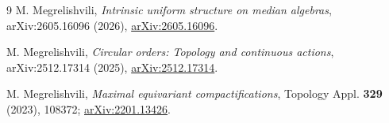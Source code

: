 \documentclass[11pt]{article}
\begin{document}
\begin{thebibliography}{9}
M. Megrelishvili,
\emph{Intrinsic uniform structure on median algebras},
arXiv:2605.16096 (2026),
\href{https://arxiv.org/abs/2605.16096}{arXiv:2605.16096}.

M. Megrelishvili,
\emph{Circular orders: Topology and continuous actions},
arXiv:2512.17314 (2025),
\href{https://arxiv.org/abs/2512.17314}{arXiv:2512.17314}.

M. Megrelishvili,
\emph{Maximal equivariant compactifications},
Topology Appl. \textbf{329} (2023), 108372;
\href{https://arxiv.org/abs/2201.13426}{arXiv:2201.13426}.
\end{thebibliography}
\end{document}
